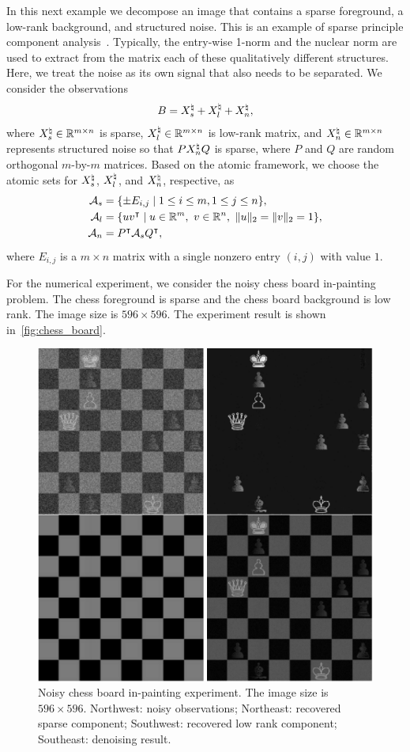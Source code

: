 In this next example we decompose an image that contains a sparse foreground, a low-rank background, and structured noise. This is an example of sparse principle component analysis~\citep{fazel1998approximations,fhb01,pati1994phase,valiant1977graph}. Typically, the entry-wise 1-norm and the nuclear norm are used to extract from the matrix each of these qualitatively different structures. Here, we treat the noise as its own signal that also needs to be separated. We consider the observations
\[B = X^{\natural}_s + X^{\natural}_l + X^{\natural}_n,\]
where $X^{\natural}_s\in\mathbb{R}^{m\times n}$ is sparse, $X^{\natural}_l\in\mathbb{R}^{m\times n}$ is low-rank matrix, and $X^{\natural}_n\in\mathbb{R}^{m\times n}$ represents structured noise so that $PX^{\natural}_nQ$ is sparse, where $P$ and $Q$ are random orthogonal $m$-by-$m$ matrices. Based on the atomic framework, we choose the atomic sets for $X^{\natural}_s$, $X^{\natural}_l$, and $X^{\natural}_n$, respective, as
\begin{align*}
    \Ascr_s &= \{\pm E_{i,j} \mid 1 \leq i \leq m, 1 \leq j \leq n \},
  \\\Ascr_l &= \{uv^\intercal \mid u \in \Re^m,\ v \in \Re^n,\ \|u\|_2=\|v\|_2 = 1\},
  \\\Ascr_n &= P^\intercal\Ascr_s Q^\intercal,
\end{align*}
where $E_{i,j}$ is a $m\times n$ matrix with a single nonzero entry $(i,j)$ with value $1$. 

For the numerical experiment, we consider the noisy chess board in-painting problem. The chess foreground is sparse and the chess board background is low rank. The image size is $596\times596$. The experiment result is shown in~\autoref{fig:chess_board}. 

\begin{figure}[t]
    \centering
    \includegraphics[width=.6\textwidth]{./figures/ChessBoard.pdf}
    \caption{Noisy chess board in-painting experiment. The image size is $596\times596$. Northwest: noisy observations; Northeast: recovered sparse component; Southwest: recovered low rank component; Southeast: denoising result.}
    \label{fig:chess_board}
\end{figure}

